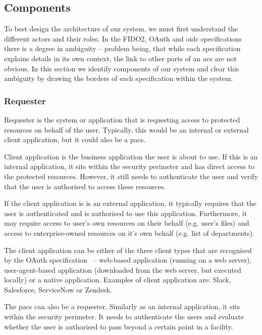 \subsection{Components}
To best design the architecture of our system, we must first understand the different actors and their roles. In the FIDO2, OAuth and \acrshort{oidc} specifications there is a degree in ambiguity -- problem being, that while each specification explains details in its own context, the link to other parts of an \acrshort{acs} are not obvious. In this section we identify components of our system and clear this ambiguity by drawing the borders of each specification within the system.
% 

\subsubsection{Requester} 
Requester is the system or application that is requesting access to protected resources on behalf of the user. Typically, this would be an internal or external client application, but it could also be a \acrshort{pacs}.

Client application is the business application the user is about to use. If this is an internal application, it sits within the security perimeter and has direct access to the protected resources. However, it still needs to authenticate the user and verify that the user is authorised to access these resources.

If the client application is is an external application, it typically requires that the user is authenticated and is authorised to use this application. Furthermore, it may require access to user's own resources on their behalf (e.g. user's files) and access to enterprise-owned resources on it's own behalf (e.g. list of departments).
    
The client application can be either of the three client types that are recognised by the OAuth specification~\cite{Hardt2012TheFramework} -- web-based application (running on a web server), user-agent-based application (downloaded from the web server, but executed locally) or a native application. Examples of client application are: Slack, Salesforce, ServiceNow or Zendesk.

The \acrshort{pacs} can also be a requester. Similarly as an internal application, it sits within the security perimeter. It needs to authenticate the users and evaluate whether the user is authorised to pass beyond a certain point in a facility.

